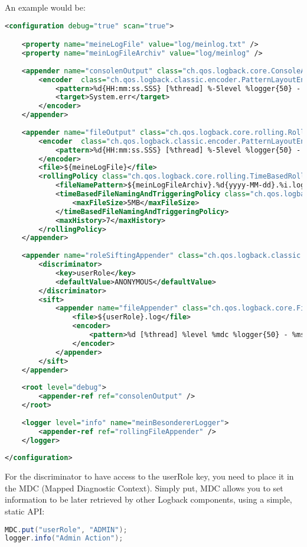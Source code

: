An example would be: 
\begin{lstlisting}[language=xml]
<configuration debug="true" scan="true">

    <property name="meineLogFile" value="log/meinlog.txt" />
    <property name="meinLogFileArchiv" value="log/meinlog" />
    
    <appender name="consolenOutput" class="ch.qos.logback.core.ConsoleAppender">
        <encoder  class="ch.qos.logback.classic.encoder.PatternLayoutEncoder">
            <pattern>%d{HH:mm:ss.SSS} [%thread] %-5level %logger{50} - %msg%n</pattern>
            <target>System.err</target>
        </encoder>
    </appender>
    
    <appender name="fileOutput" class="ch.qos.logback.core.rolling.RollingFileAppender">
        <encoder  class="ch.qos.logback.classic.encoder.PatternLayoutEncoder">
            <pattern>%d{HH:mm:ss.SSS} [%thread] %-5level %logger{50} - %msg%n</pattern>
        </encoder>
        <file>${meineLogFile}</file>
        <rollingPolicy class="ch.qos.logback.core.rolling.TimeBasedRollingPolicy">
			<fileNamePattern>${meinLogFileArchiv}.%d{yyyy-MM-dd}.%i.log</fileNamePattern>
			<timeBasedFileNamingAndTriggeringPolicy class="ch.qos.logback.core.rolling.SizeAndTimeBasedFNATP">
				<maxFileSize>5MB</maxFileSize>
			</timeBasedFileNamingAndTriggeringPolicy>
			<maxHistory>7</maxHistory>
		</rollingPolicy>
    </appender>
    
    <appender name="roleSiftingAppender" class="ch.qos.logback.classic.sift.SiftingAppender">
        <discriminator>
            <key>userRole</key>
            <defaultValue>ANONYMOUS</defaultValue>
        </discriminator>
        <sift>
            <appender name="fileAppender" class="ch.qos.logback.core.FileAppender">
                <file>${userRole}.log</file>
                <encoder>
                    <pattern>%d [%thread] %level %mdc %logger{50} - %msg%n</pattern>
                </encoder>
            </appender>
        </sift>
    </appender>
    
    <root level="debug">
        <appender-ref ref="consolenOutput" />
    </root>
    
    <logger level="info" name="meinBesondererLogger">
        <appender-ref ref="rollingFileAppender" />
    </logger>
    
</configuration>
\end{lstlisting}
For the discriminator to have access to the userRole key, you need to place it in the MDC (Mapped Diagnostic Context). Simply put, MDC allows you to set information to be later retrieved by other Logback components, using a simple, static API:
\begin{lstlisting}[language=java]
MDC.put("userRole", "ADMIN");
logger.info("Admin Action");
\end{lstlisting}